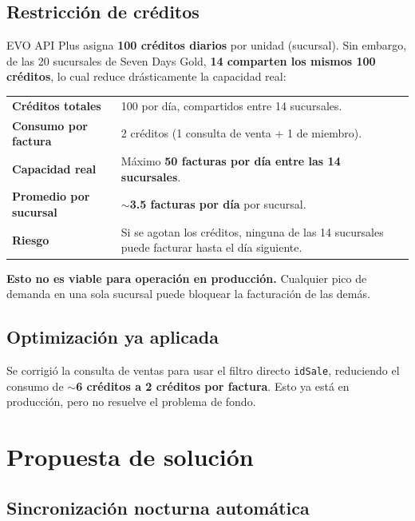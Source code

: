 \documentclass[11pt,a4paper]{article}
\begin{document}
\subsection*{Restricción de créditos}

EVO API Plus asigna \textbf{100 créditos diarios} por unidad (sucursal). Sin embargo, de las 20 sucursales de Seven Days Gold, \textbf{14 comparten los mismos 100 créditos}, lo cual reduce drásticamente la capacidad real:

\begin{center}
\begin{tabularx}{0.92\textwidth}{lX}
  \textbf{Créditos totales} & 100 por día, compartidos entre 14 sucursales. \\[0.4em]
  \textbf{Consumo por factura} & 2 créditos (1 consulta de venta + 1 de miembro). \\[0.4em]
  \textbf{Capacidad real} & Máximo \textbf{50 facturas por día entre las 14 sucursales}. \\[0.4em]
  \textbf{Promedio por sucursal} & $\sim$\textbf{3.5 facturas por día} por sucursal. \\[0.4em]
  \textbf{Riesgo} & Si se agotan los créditos, ninguna de las 14 sucursales puede facturar hasta el día siguiente. \\
\end{tabularx}
\end{center}

\textbf{Esto no es viable para operación en producción.} Cualquier pico de demanda en una sola sucursal puede bloquear la facturación de las demás.

\subsection*{Optimización ya aplicada}

Se corrigió la consulta de ventas para usar el filtro directo \texttt{idSale}, reduciendo el consumo de \textbf{$\sim$6 créditos a 2 créditos por factura}. Esto ya está en producción, pero no resuelve el problema de fondo.

\section*{Propuesta de solución}

\subsection*{Sincronización nocturna automática}
\end{document}
